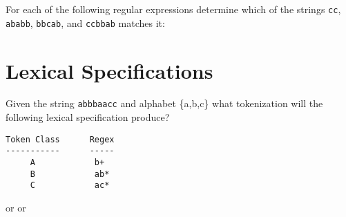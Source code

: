 \documentclass[11pt, oneside]{exam}
\begin{document}
\begin{questions}

\question
For each of the following regular expressions determine which of the strings {\tt cc}, {\tt ababb}, {\tt bbcab}, and {\tt ccbbab}
matches it:


\section*{Lexical Specifications}

\question[3]
Given the string {\tt abbbaacc} and alphabet \{a,b,c\} what tokenization will the following lexical specification produce?
\begin{verbatim}
Token Class      Regex
-----------      -----
     A            b+
     B            ab*
     C            ac*
\end{verbatim}
{\tt <B, abbb>}
 or {\tt <C, a>}
 or {\tt <C, a>}


\end{questions}
\end{document}
